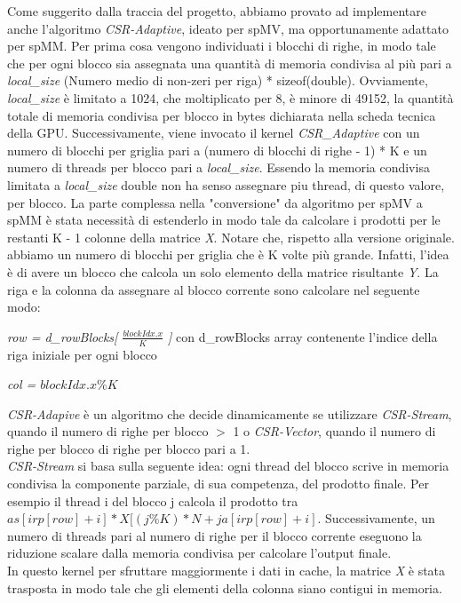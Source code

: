 \documentclass{article}
\begin{document}
Come suggerito dalla traccia del progetto, abbiamo provato ad implementare anche l'algoritmo \textit{CSR-Adaptive}, ideato per spMV, ma opportunamente adattato per spMM. Per prima cosa vengono individuati i blocchi di righe, in modo tale che per ogni blocco sia assegnata una quantità di memoria condivisa al più pari a \textit{local\_size} (Numero medio di non-zeri per riga) * sizeof(double). Ovviamente, \textit{local\_size} è limitato a 1024, che moltiplicato per 8, è minore di 49152, la quantità totale di memoria condivisa per blocco in bytes dichiarata nella scheda tecnica della GPU. Successivamente, viene invocato il kernel \textit{CSR\_Adaptive} con un numero di blocchi per griglia pari a (numero di blocchi di righe - 1) * K e un numero di threads per blocco pari a \textit{local\_size}. Essendo la memoria condivisa limitata a \textit{local\_size} double non ha senso assegnare piu thread, di questo valore, per blocco. La parte complessa nella "conversione" da algoritmo per spMV a spMM è stata necessità di estenderlo in modo tale da calcolare i prodotti per le restanti K - 1 colonne della matrice \textit{X}. Notare che, rispetto alla versione originale. abbiamo un numero di blocchi per griglia che è K volte più grande. Infatti, l'idea è di avere un blocco che calcola un solo elemento della matrice risultante \textit{Y}. La riga e la colonna da assegnare al blocco corrente sono calcolare nel seguente modo:
    \begin{center}
    \item \textit{row = d\_rowBlocks[ $\frac{blockIdx.x} {K}$ ]} con
    d\_rowBlocks array contenente l'indice della riga iniziale per ogni blocco  
    \item \textit{col = $blockIdx.x \% K$}
    \end{center}

\textit{CSR-Adapive} è un algoritmo che decide dinamicamente se utilizzare \textit{CSR-Stream}, quando il numero di righe per blocco $>$ 1 o \textit{CSR-Vector}, quando il numero di righe per blocco di righe per blocco pari a 1. \\
\textit{CSR-Stream} si basa sulla seguente idea: ogni thread del blocco scrive in memoria condivisa la componente parziale, di sua competenza, del prodotto finale. Per esempio il thread i del blocco j calcola il prodotto tra $as[irp[row] + i] * X[(j \% K ) * N + ja[irp[row]+ i]$. Successivamente, un numero di threads pari al numero di righe per il blocco corrente eseguono la riduzione scalare dalla memoria condivisa per calcolare l'output finale. 
\\ In questo kernel per sfruttare maggiormente i dati in cache, la matrice \textit{X} è stata trasposta in modo tale che gli elementi della colonna siano contigui in memoria.\\
\end{document}
